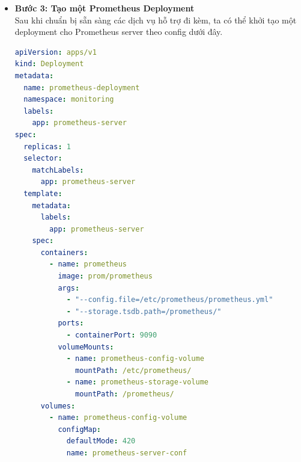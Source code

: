 \begin{itemize}
\begin{lstlisting}[language=yaml]
        - source_labels: [__meta_kubernetes_service_annotation_prometheus_io_path]
          action: replace
          target_label: __metrics_path__
          regex: (.+)
        - source_labels: [__address__, __meta_kubernetes_service_annotation_prometheus_io_port]
          action: replace
          target_label: __address__
          regex: ([^:]+)(?::\d+)?;(\d+)
          replacement: $1:$2
        - action: labelmap
          regex: __meta_kubernetes_service_label_(.+)
        - source_labels: [__meta_kubernetes_namespace]
          action: replace
          target_label: kubernetes_namespace
        - source_labels: [__meta_kubernetes_service_name]
          action: replace
          target_label: kubernetes_name
  \end{lstlisting}
  \item \textbf{Bước 3: Tạo một Prometheus Deployment}\\[0.2cm]
  Sau khi chuẩn bị sẵn sàng các dịch vụ hỗ trợ đi kèm, ta có thể khởi tạo một deployment cho Prometheus server theo config dưới đây.
  \begin{lstlisting}[language=yaml]
apiVersion: apps/v1
kind: Deployment
metadata:
  name: prometheus-deployment
  namespace: monitoring
  labels:
    app: prometheus-server
spec:
  replicas: 1
  selector:
    matchLabels:
      app: prometheus-server
  template:
    metadata:
      labels:
        app: prometheus-server
    spec:
      containers:
        - name: prometheus
          image: prom/prometheus
          args:
            - "--config.file=/etc/prometheus/prometheus.yml"
            - "--storage.tsdb.path=/prometheus/"
          ports:
            - containerPort: 9090
          volumeMounts:
            - name: prometheus-config-volume
              mountPath: /etc/prometheus/
            - name: prometheus-storage-volume
              mountPath: /prometheus/
      volumes:
        - name: prometheus-config-volume
          configMap:
            defaultMode: 420
            name: prometheus-server-conf
  

\end{lstlisting}
\end{itemize}
